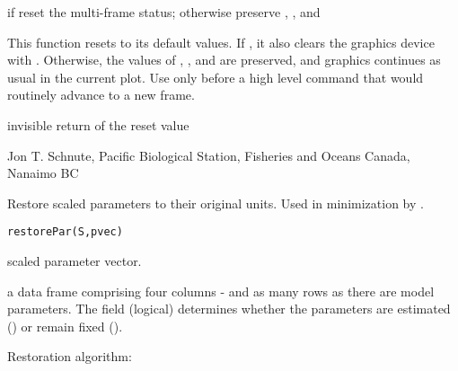 \documentclass[letterpaper]{book}
\begin{document}
%
\begin{Arguments}
\begin{ldescription}
\item[\code{reset.mf}] if  reset the multi-frame status; otherwise
preserve , , and 
\end{ldescription}
\end{Arguments}
%
\begin{Details}\relax
This function resets  to its default values.
If , it also clears the graphics device with 
. Otherwise, the values of , , 
and  are preserved, and graphics continues as usual in
the current plot. Use  only before a high level
command that would routinely advance to a new frame.
\end{Details}
%
\begin{Value}
invisible return of the reset value 
\end{Value}
%
\begin{Author}\relax
Jon T. Schnute, Pacific Biological Station, Fisheries and Oceans Canada, Nanaimo BC
\end{Author}
%
\begin{Description}\relax
Restore scaled parameters to their original units. Used in minimization by .
\end{Description}
%
\begin{Usage}
\begin{verbatim}
restorePar(S,pvec)
\end{verbatim}
\end{Usage}
%
\begin{Arguments}
\begin{ldescription}
\item[\code{S}] scaled parameter vector.
\item[\code{pvec}] a data frame comprising four columns - 
 and as many rows as there are model 
parameters. The  field (logical) determines whether the 
parameters are estimated () or remain fixed ().
\end{ldescription}
\end{Arguments}
%
\begin{Details}\relax
Restoration algorithm:  
\end{Details}
\end{document}
